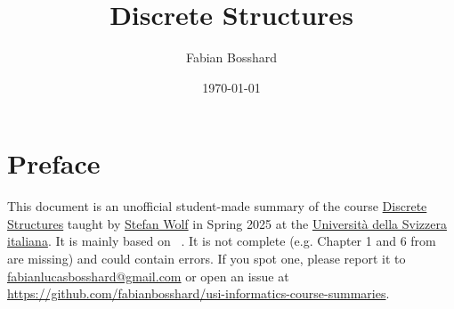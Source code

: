 
\usepackage{caption, subcaption}

\usepackage[backend=biber,style=numeric]{biblatex}



\usepackage[
  colorlinks=false,        %
  pdfborder={0 0 0}        %
]{hyperref}
\usepackage[
  type     = {CC},
  modifier = {by},
  version  = {4.0},
]{doclicense}
\usepackage{cleveref}







\title{Discrete Structures}
\author{Fabian Bosshard}
\date{\today}






\pagestyle{plain}


\maketitle


\tableofcontents







\section*{Preface}

This document is an unofficial student-made summary of the course 
\href{https://search.usi.ch/courses/35270737/discrete-structures}{Discrete Structures} taught by \href{https://search.usi.ch/people/eefbe656c9dfacf0e1a1e15bf8893bcb/wolf-stefan}{Stefan Wolf} in Spring 2025 at the 
\href{https://www.usi.ch/it}{Università della Svizzera italiana}.
It is mainly based on ~\cite{boschini2022}.
It is not complete (e.g. Chapter 1 and 6 from \cite{boschini2022} are missing) and could contain errors.
If you spot one, please report it to \href{mailto:fabianlucasbosshard@gmail.com}{fabianlucasbosshard@gmail.com} or open an issue at \url{https://github.com/fabianbosshard/usi-informatics-course-summaries}.


